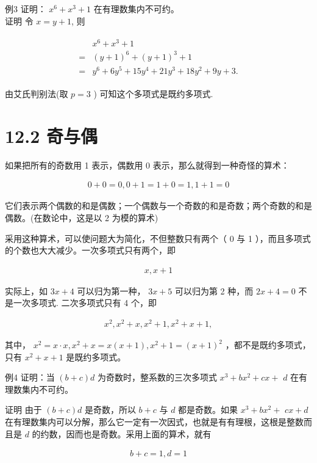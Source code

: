 \documentclass[10pt]{article}
\begin{document}
例3 证明： $x^{6}+x^{3}+1$ 在有理数集内不可约。\\
证明 令 $x=y+1$, 则

\begin{align*}
\begin{aligned}
& x^{6}+x^{3}+1 \\
= & (y+1)^{6}+(y+1)^{3}+1 \\
= & y^{6}+6 y^{5}+15 y^{4}+21 y^{3}+18 y^{2}+9 y+3 .
\end{aligned}
\end{align*}

由艾氏判别法(取 $p=3$ ) 可知这个多项式是既约多项式.

\section*{12.2 奇与偶}
如果把所有的奇数用 1 表示，偶数用 0 表示，那么就得到一种奇怪的算术：

\begin{align*}
0+0=0,0+1=1+0=1,1+1=0
\end{align*}

它们表示两个偶数的和是偶数；一个偶数与一个奇数的和是奇数；两个奇数的和是偶数。(在数论中，这是以 2 为模的算术)

采用这种算术，可以使问题大为简化，不但整数只有两个（ 0 与 1 ），而且多项式的个数也大大减少。一次多项式只有两个，即

\begin{align*}
x, x+1
\end{align*}

实际上，如 $3 x+4$ 可以归为第一种， $3 x+5$ 可以归为第 2 种，而 $2 x+4=0$ 不是一次多项式. 二次多项式只有 4 个，即

\begin{align*}
x^{2}, x^{2}+x, x^{2}+1, x^{2}+x+1,
\end{align*}

其中， $x^{2}=x \cdot x, x^{2}+x=x(x+1), x^{2}+1=(x+1)^{2}$ ，都不是既约多项式，只有 $x^{2}+x+1$ 是既约多项式。

例4 证明：当 $(b+c) d$ 为奇数时，整系数的三次多项式 $x^{3}+b x^{2}+c x+$ $d$ 在有理数集内不可约。

证明 由于 $(b+c) d$ 是奇数，所以 $b+c$ 与 $d$ 都是奇数。如果 $x^{3}+b x^{2}+$ $c x+d$ 在有理数集内可以分解，那么它一定有一次因式，也就是有有理根，这根是整数而且是 $d$ 的约数，因而也是奇数。采用上面的算术，就有

\begin{align*}
b+c=1, d=1
\end{align*}
\end{document}
